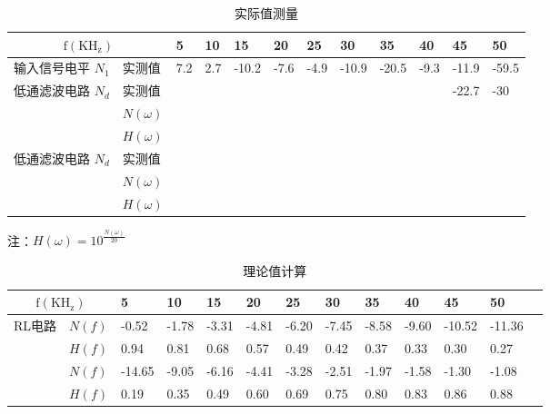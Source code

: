 \documentclass[dvipsnames, svgnames,a4paper,11pt]{article}
\begin{document}
\begin{table}[H]
  \renewcommand\arraystretch{1.7}
  \centering
  \caption{实际值测量}
  \begin{tabularx}{\textwidth}{|p{}|X|X|X|X|X|X|X|X|X|X|X|}
    \hline
    \multicolumn{2}{|c|}{$\mathrm{f(KH_z)}$} & 5 & 10 & 15 & 20 & 25 & 30 & 35 & 40 & 45 & 50 \\
    \hline
    输入信号电平 $N_1$ & 实测值 & 7.2 & 2.7 & -10.2 & -7.6 & -4.9 & -10.9 & -20.5 & -9.3 & -11.9 & -59.5 \\
    \hline
    \multirow{3}{*}{低通滤波电路 $N_d$} & 实测值 & &  &  &  &  & & &  & -22.7 & -30 \\
    \cline{2-12}
     & $N(\omega)$ & &  &  &  &  & & & & &  \\
     \cline{2-12}
     & $H(\omega)$ & &  &  &  &  & & & & &  \\
    \hline
    \multirow{3}{*}{低通滤波电路 $N_d$} & 实测值 & &  &  &  &  & & & & &  \\
    \cline{2-12}
    & $N(\omega)$ & &  &  &  &  & & & & &  \\
    \cline{2-12}
    & $H(\omega)$ & &  &  &  &  & & & & &  \\
    \hline
  \end{tabularx}
\end{table}
注：$H(\omega) = 10^{\frac{N(\omega)}{20}}$

\begin{table}[H]
  \renewcommand\arraystretch{1.7}
  \centering
  \caption{理论值计算}
  \begin{tabularx}{\textwidth}{|p{}|X|X|X|X|X|X|X|X|X|X|X|X|}
    \hline
    \multicolumn{2}{|c|}{$\mathrm{f(KH_z)}$} & 5 & 10 & 15 & 20 & 25 & 30 & 35 & 40 & 45 & 50 \\
    \hline
    \multirow{3}{*}{RL电路} & $N(f)$ & -0.52 & -1.78 & -3.31 & -4.81 & -6.20 & -7.45 & -8.58 & -9.60 & -10.52 & -11.36
    \\
    \cline{2-12}
     &$H(f)$ & 0.94 & 0.81 &	0.68 & 0.57	& 0.49 & 0.42 &	0.37 & 0.33 & 0.30 & 0.27
    \\
    \hline
    \multirow{3}{*}{RC电路} & $N(f)$ & -14.65 & -9.05 &	-6.16 & -4.41 &	-3.28 &	-2.51 & -1.97 & -1.58 &	-1.30 & -1.08
    \\
    \cline{2-12}
     & $H(f)$ & 0.19 & 0.35	& 0.49 & 0.60 &	0.69 & 0.75 &	0.80 & 0.83 &	0.86 & 0.88
    \\
    \hline
  \end{tabularx}
\end{table}
\end{document}
